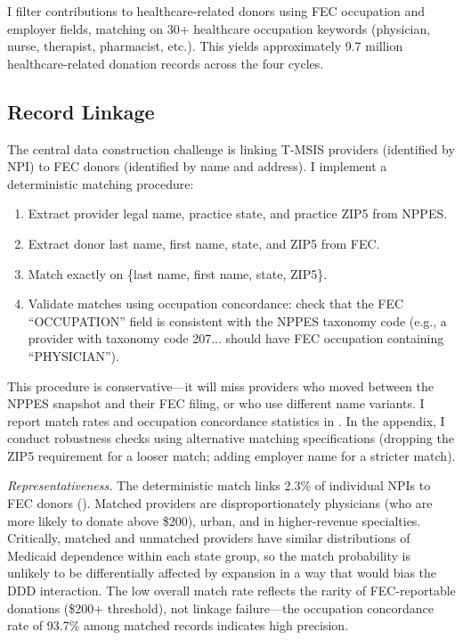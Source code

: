 \documentclass[12pt]{article}
\begin{document}
I filter contributions to healthcare-related donors using FEC occupation and employer fields, matching on 30+ healthcare occupation keywords (physician, nurse, therapist, pharmacist, etc.). This yields approximately 9.7 million healthcare-related donation records across the four cycles.

\subsection{Record Linkage}

The central data construction challenge is linking T-MSIS providers (identified by NPI) to FEC donors (identified by name and address). I implement a deterministic matching procedure:

\begin{enumerate}
    \item Extract provider legal name, practice state, and practice ZIP5 from NPPES.
    \item Extract donor last name, first name, state, and ZIP5 from FEC.
    \item Match exactly on \{last name, first name, state, ZIP5\}.
    \item Validate matches using occupation concordance: check that the FEC ``OCCUPATION'' field is consistent with the NPPES taxonomy code (e.g., a provider with taxonomy code 207... should have FEC occupation containing ``PHYSICIAN'').
\end{enumerate}

This procedure is conservative---it will miss providers who moved between the NPPES snapshot and their FEC filing, or who use different name variants. I report match rates and occupation concordance statistics in . In the appendix, I conduct robustness checks using alternative matching specifications (dropping the ZIP5 requirement for a looser match; adding employer name for a stricter match).

\textit{Representativeness.} The deterministic match links 2.3\% of individual NPIs to FEC donors (). Matched providers are disproportionately physicians (who are more likely to donate above \$200), urban, and in higher-revenue specialties. Critically, matched and unmatched providers have similar distributions of Medicaid dependence within each state group, so the match probability is unlikely to be differentially affected by expansion in a way that would bias the DDD interaction. The low overall match rate reflects the rarity of FEC-reportable donations (\$200+ threshold), not linkage failure---the occupation concordance rate of 93.7\% among matched records indicates high precision.
\end{document}
